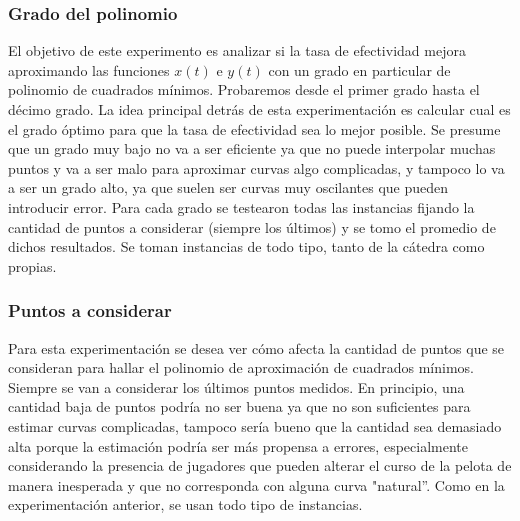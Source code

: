 \subsubsection{Grado del polinomio}
El objetivo de este experimento es analizar si la tasa de efectividad mejora aproximando las funciones $x(t)$ e $y(t)$ con un grado en 
particular de polinomio de cuadrados mínimos. Probaremos desde el primer grado hasta el décimo grado. La idea principal detrás de esta 
experimentación es calcular cual es el grado óptimo para que la tasa de efectividad sea lo mejor posible. Se presume que un grado muy 
bajo no va a ser eficiente ya que no puede interpolar muchas puntos y va a ser malo para aproximar curvas algo complicadas, y tampoco 
lo va a ser un grado alto, ya que suelen ser curvas muy oscilantes que pueden introducir error. Para cada grado se testearon todas las instancias 
fijando la cantidad de puntos a considerar (siempre los últimos) y se tomo el promedio de dichos resultados. Se toman instancias de todo tipo, 
tanto de la cátedra como propias.

\subsubsection{Puntos a considerar}
Para esta experimentación se desea ver cómo afecta la cantidad de puntos que se consideran para hallar el polinomio de aproximación de 
cuadrados mínimos. Siempre se van a considerar los últimos puntos medidos. En principio, una cantidad baja de puntos podría no ser 
buena ya que no son suficientes para estimar curvas complicadas, tampoco sería bueno que la cantidad sea demasiado alta porque la 
estimación podría ser más propensa a errores, especialmente considerando la presencia de jugadores que pueden alterar el curso de la 
pelota de manera inesperada y que no corresponda con alguna curva "natural''. Como en la experimentación anterior, se usan todo tipo 
de instancias.


